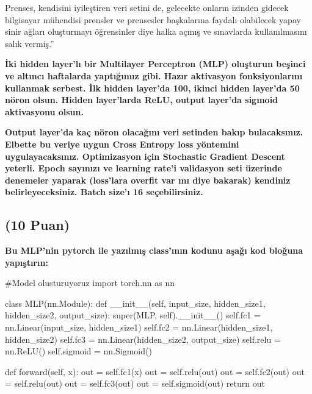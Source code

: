 \documentclass[11pt]{article}
\begin{document}
Prenses, kendisini iyileştiren veri setini de, gelecekte onların izinden gidecek bilgisayar mühendisi prensler ve prensesler başkalarına faydalı olabilecek yapay sinir ağları oluşturmayı öğrensinler diye halka açmış ve sınavlarda kullanılmasını salık vermiş.''

\textbf{İki hidden layer'lı bir Multilayer Perceptron (MLP) oluşturun beşinci ve altıncı haftalarda yaptığımız gibi. Hazır aktivasyon fonksiyonlarını kullanmak serbest. İlk hidden layer'da 100, ikinci hidden layer'da 50 nöron olsun. Hidden layer'larda ReLU, output layer'da sigmoid aktivasyonu olsun.}

\textbf{Output layer'da kaç nöron olacağını veri setinden bakıp bulacaksınız. Elbette bu veriye uygun Cross Entropy loss yöntemini uygulayacaksınız. Optimizasyon için Stochastic Gradient Descent yeterli. Epoch sayınızı ve learning rate'i validasyon seti üzerinde denemeler yaparak (loss'lara overfit var mı diye bakarak) kendiniz belirleyeceksiniz. Batch size'ı 16 seçebilirsiniz.}
\newpage

\subsection{(10 Puan)} \textbf{Bu MLP'nin pytorch ile yazılmış class'ının kodunu aşağı kod bloğuna yapıştırın:}
\vspace{.3in}
\begin{python}
#Model olusturuyoruz
import torch.nn as nn

class MLP(nn.Module):
    def __init__(self, input_size, hidden_size1, hidden_size2, output_size):
        super(MLP, self).__init__()
        self.fc1 = nn.Linear(input_size, hidden_size1)
        self.fc2 = nn.Linear(hidden_size1, hidden_size2)
        self.fc3 = nn.Linear(hidden_size2, output_size)
        self.relu = nn.ReLU()
        self.sigmoid = nn.Sigmoid()

    def forward(self, x):
        out = self.fc1(x)
        out = self.relu(out)
        out = self.fc2(out)
        out = self.relu(out)
        out = self.fc3(out)
        out = self.sigmoid(out)
        return out
\end{python}
\vspace{.5in}
\end{document}

